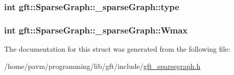 \hypertarget{structgft_1_1SparseGraph_1_1__sparseGraph_ad8ec377c188a20bceeee51b0f518532b}{
\subsubsection[{type}]{\setlength{\rightskip}{0pt plus 5cm}int gft\-::\-Sparse\-Graph\-::\-\_\-sparse\-Graph\-::type}}\label{structgft_1_1SparseGraph_1_1__sparseGraph_ad8ec377c188a20bceeee51b0f518532b}
\hypertarget{structgft_1_1SparseGraph_1_1__sparseGraph_a0b02d8b7403d6218c12576f7944e62dc}{
\subsubsection[{Wmax}]{\setlength{\rightskip}{0pt plus 5cm}int gft\-::\-Sparse\-Graph\-::\-\_\-sparse\-Graph\-::\-Wmax}}\label{structgft_1_1SparseGraph_1_1__sparseGraph_a0b02d8b7403d6218c12576f7944e62dc}


The documentation for this struct was generated from the following file\-:\begin{DoxyCompactItemize}
\item 
/home/pavm/programming/lib/gft/include/\hyperlink{gft__sparsegraph_8h}{gft\-\_\-sparsegraph.\-h}\end{DoxyCompactItemize}
